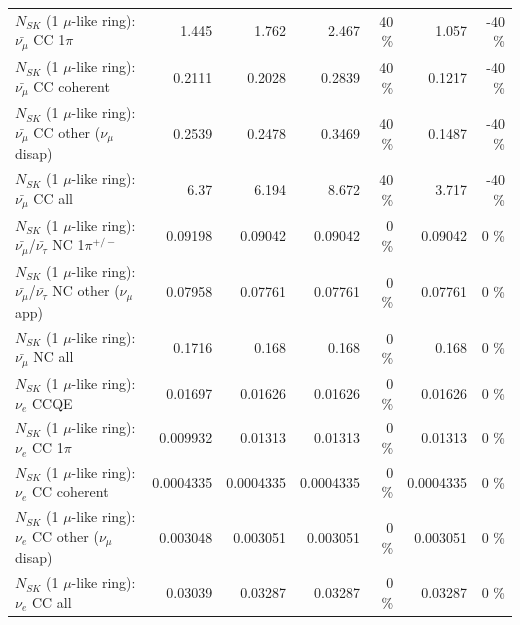 \begin{table}
\begin{tabular}{| l | r | r | r  r | r  r |}
                         $N_{SK}$ (1 $\mu$-like ring): $\bar{\nu_\mu}$ CC 1$\pi$ &           1.445 &           1.762 &           2.467 &       40 \%  &           1.057 &      -40 \%  \\ 
                       $N_{SK}$ (1 $\mu$-like ring): $\bar{\nu_\mu}$ CC coherent &          0.2111 &          0.2028 &          0.2839 &       40 \%  &          0.1217 &      -40 \%  \\ 
        $N_{SK}$ (1 $\mu$-like ring): $\bar{\nu_\mu}$ CC other ($\nu_\mu$ disap) &          0.2539 &          0.2478 &          0.3469 &       40 \%  &          0.1487 &      -40 \%  \\ 
                          $N_{SK}$ (1 $\mu$-like ring): $\bar{\nu_{\mu}}$ CC all &            6.37 &           6.194 &           8.672 &       40 \%  &           3.717 &      -40 \%  \\ 
\hline
  $N_{SK}$ (1 $\mu$-like ring): $\bar{\nu_\mu}$/$\bar{\nu_\tau}$ NC 1$\pi^{+/-}$ &         0.09198 &         0.09042 &         0.09042 &        0 \%  &         0.09042 &        0 \%  \\ 
$N_{SK}$ (1 $\mu$-like ring): $\bar{\nu_\mu}$/$\bar{\nu_\tau}$ NC other ($\nu_\mu$ app) &         0.07958 &         0.07761 &         0.07761 &        0 \%  &         0.07761 &        0 \%  \\ 
                          $N_{SK}$ (1 $\mu$-like ring): $\bar{\nu_{\mu}}$ NC all &          0.1716 &           0.168 &           0.168 &        0 \%  &           0.168 &        0 \%  \\ 
\hline
\hline
\hline
                                      $N_{SK}$ (1 $\mu$-like ring): $\nu_e$ CCQE &         0.01697 &         0.01626 &         0.01626 &        0 \%  &         0.01626 &        0 \%  \\ 
                                 $N_{SK}$ (1 $\mu$-like ring): $\nu_e$ CC 1$\pi$ &        0.009932 &         0.01313 &         0.01313 &        0 \%  &         0.01313 &        0 \%  \\ 
                               $N_{SK}$ (1 $\mu$-like ring): $\nu_e$ CC coherent &       0.0004335 &       0.0004335 &       0.0004335 &        0 \%  &       0.0004335 &        0 \%  \\ 
                $N_{SK}$ (1 $\mu$-like ring): $\nu_e$ CC other ($\nu_\mu$ disap) &        0.003048 &        0.003051 &        0.003051 &        0 \%  &        0.003051 &        0 \%  \\ 
                                  $N_{SK}$ (1 $\mu$-like ring): $\nu_{e}$ CC all &         0.03039 &         0.03287 &         0.03287 &        0 \%  &         0.03287 &        0 \%  \\ 

\end{tabular}
\end{table}
